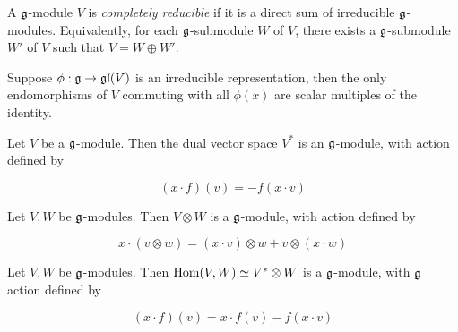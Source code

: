 \documentclass{article}
\begin{document}
\begin{definition}
     A \(\mathfrak{g}\)-module \(V\) is \emph{completely reducible} if it is a direct sum of irreducible \(\mathfrak{g}\)-modules. Equivalently, for each \(\mathfrak{g}\)-submodule \(W\) of \(V\), there exists a \(\mathfrak{g}\)-submodule \(W'\) of \(V\) such that \(V = W \oplus W'\).
\end{definition}

\begin{lemma}
    [Schur] Suppose \(\phi : \mathfrak{g} \to \mathfrak{g}\mathfrak{l}(V)\) is an irreducible representation, then the only endomorphisms of \(V\) commuting with all \(\phi(x)\) are scalar multiples of the identity.
\end{lemma}

\begin{definition}
     Let \(V\) be a \(\mathfrak{g}\)-module. Then the dual vector space \(V^*\) is an \(\mathfrak{g}\)-module, with action defined by

    \[(x\cdot f)(v) = -f(x \cdot v)\]
\end{definition}

\begin{definition}
     Let \(V, W\) be \(\mathfrak{g}\)-modules. Then \(V \otimes W\) is a \(\mathfrak{g}\)-module, with action defined by

    \[x \cdot (v \otimes w) = (x \cdot v) \otimes w + v \otimes (x \cdot w)\]
\end{definition}

\begin{definition}
     Let \(V, W\) be \(\mathfrak{g}\)-modules. Then \(\operatorname{Hom}(V, W) \simeq V^* \otimes W\) is a \(\mathfrak{g}\)-module, with \(\mathfrak{g}\) action defined by

    \[(x \cdot f)(v) = x \cdot f(v) - f(x \cdot v)\]
\end{definition}





\end{document}
